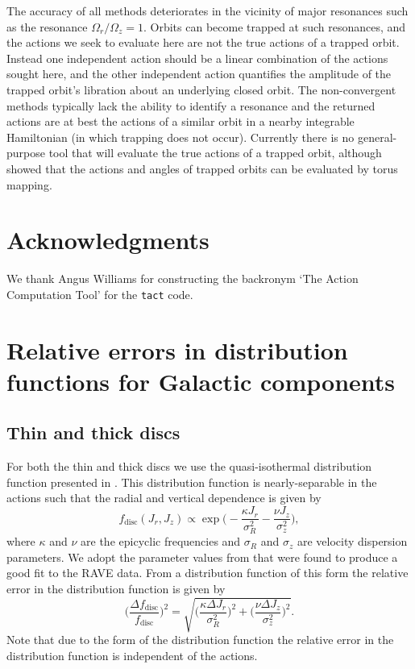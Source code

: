 \documentclass[useAMS,usenatbib,fleqn,a4paper]{mn2e}
\begin{document}
The accuracy of all methods deteriorates in the vicinity of major resonances
such as the resonance $\Omega_r/\Omega_z=1$. Orbits can become trapped at
such resonances, and the actions we seek to evaluate here are not the true
actions of a trapped orbit. Instead one independent action should be a linear
combination of the actions sought here, and the other independent action
quantifies the amplitude of the trapped orbit's libration about an underlying
closed orbit.  The non-convergent methods typically lack the ability to
identify a resonance and the returned actions are at best the actions of a
similar orbit in a nearby integrable Hamiltonian (in which trapping does not
occur). Currently there is no general-purpose tool that will evaluate the
true actions of a trapped orbit, although \cite{KaasalainenB} showed that the
actions and angles of trapped orbits can be evaluated by torus mapping.

\section*{Acknowledgments}
We thank Angus Williams for constructing the backronym `The Action Computation Tool' for the \texttt{tact} code.




\appendix
\section{Relative errors in distribution functions for Galactic components}\label{Appendix}
\subsection{Thin and thick discs}

For both the thin and thick discs we use the quasi-isothermal distribution
function presented in \cite{Binney2010}. This distribution function is
nearly-separable in the actions such that the radial and vertical dependence
is given by
\begin{equation}
f_\mathrm{disc}(J_r,J_z) \propto \exp \Big(-\frac{\kappa J_r}{\sigma_R^2}-\frac{\nu J_z}{\sigma_z^2}\Big),
\end{equation}
where $\kappa$ and $\nu$ are the epicyclic frequencies and $\sigma_R$ and
$\sigma_z$ are velocity dispersion parameters. We adopt the parameter values
from \cite{Piffl2014} that were found to produce a good fit to the RAVE data.
From a distribution function of this form the relative error in the
distribution function is given by
\begin{equation}
\Big(\frac{\Delta f_\mathrm{disc}}{f_\mathrm{disc}}\Big)^2 = \sqrt{\Big(\frac{\kappa\Delta J_r}{\sigma_R^2}\Big)^2+\Big(\frac{\nu\Delta J_z}{\sigma_z^2}\Big)^2}.
\end{equation}
Note that due to the form of the distribution function the relative error in
the distribution function is independent of the actions.
\end{document}
